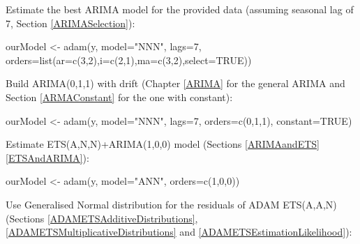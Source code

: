 \documentclass[
]{book}
\newenvironment{Shaded}{\begin{snugshade}}{\end{snugshade}}
\newcommand{\AttributeTok}[1]{\textcolor[rgb]{0.77,0.63,0.00}{#1}}
\newcommand{\ConstantTok}[1]{\textcolor[rgb]{0.00,0.00,0.00}{#1}}
\newcommand{\DecValTok}[1]{\textcolor[rgb]{0.00,0.00,0.81}{#1}}
\newcommand{\FunctionTok}[1]{\textcolor[rgb]{0.00,0.00,0.00}{#1}}
\newcommand{\NormalTok}[1]{#1}
\newcommand{\OtherTok}[1]{\textcolor[rgb]{0.56,0.35,0.01}{#1}}
\newcommand{\StringTok}[1]{\textcolor[rgb]{0.31,0.60,0.02}{#1}}
\theoremstyle{definition}
\theoremstyle{definition}
\theoremstyle{definition}
\theoremstyle{definition}
\theoremstyle{remark}
\begin{document}
Estimate the best ARIMA model for the provided data (assuming seasonal lag of 7, Section \ref{ARIMASelection}):

\begin{Shaded}
\begin{Highlighting}[]
\NormalTok{ourModel }\OtherTok{\textless{}{-}} \FunctionTok{adam}\NormalTok{(y, }\AttributeTok{model=}\StringTok{"NNN"}\NormalTok{, }\AttributeTok{lags=}\DecValTok{7}\NormalTok{,}
                 \AttributeTok{orders=}\FunctionTok{list}\NormalTok{(}\AttributeTok{ar=}\FunctionTok{c}\NormalTok{(}\DecValTok{3}\NormalTok{,}\DecValTok{2}\NormalTok{),}\AttributeTok{i=}\FunctionTok{c}\NormalTok{(}\DecValTok{2}\NormalTok{,}\DecValTok{1}\NormalTok{),}\AttributeTok{ma=}\FunctionTok{c}\NormalTok{(}\DecValTok{3}\NormalTok{,}\DecValTok{2}\NormalTok{),}\AttributeTok{select=}\ConstantTok{TRUE}\NormalTok{))}
\end{Highlighting}
\end{Shaded}

Build ARIMA(0,1,1) with drift (Chapter \ref{ARIMA} for the general ARIMA and Section \ref{ARMAConstant} for the one with constant):

\begin{Shaded}
\begin{Highlighting}[]
\NormalTok{ourModel }\OtherTok{\textless{}{-}} \FunctionTok{adam}\NormalTok{(y, }\AttributeTok{model=}\StringTok{"NNN"}\NormalTok{, }\AttributeTok{lags=}\DecValTok{7}\NormalTok{,}
                 \AttributeTok{orders=}\FunctionTok{c}\NormalTok{(}\DecValTok{0}\NormalTok{,}\DecValTok{1}\NormalTok{,}\DecValTok{1}\NormalTok{), }\AttributeTok{constant=}\ConstantTok{TRUE}\NormalTok{)}
\end{Highlighting}
\end{Shaded}

Estimate ETS(A,N,N)+ARIMA(1,0,0) model (Sections \ref{ARIMAandETS} \ref{ETSAndARIMA}):

\begin{Shaded}
\begin{Highlighting}[]
\NormalTok{ourModel }\OtherTok{\textless{}{-}} \FunctionTok{adam}\NormalTok{(y, }\AttributeTok{model=}\StringTok{"ANN"}\NormalTok{, }\AttributeTok{orders=}\FunctionTok{c}\NormalTok{(}\DecValTok{1}\NormalTok{,}\DecValTok{0}\NormalTok{,}\DecValTok{0}\NormalTok{))}
\end{Highlighting}
\end{Shaded}

Use Generalised Normal distribution for the residuals of ADAM ETS(A,A,N) (Sections \ref{ADAMETSAdditiveDistributions}, \ref{ADAMETSMultiplicativeDistributions} and \ref{ADAMETSEstimationLikelihood}):
\end{document}
